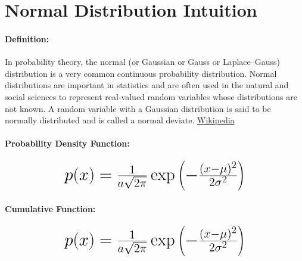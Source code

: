 \documentclass[12pt]{article}
\newcommand{\negBi}[3][2]{(#2- #3)^{#1}}
\newcommand*{\mH}[1]{\mbox{\huge$#1$}}
\begin{document}
\section*{Normal Distribution Intuition}
\paragraph{Definition:}%

In probability theory, the normal (or Gaussian or Gauss or Laplace–Gauss) distribution is a very common continuous probability distribution. Normal distributions are important in statistics and are often used in the natural and social sciences to represent real-valued random variables whose distributions are not known. A random variable with a Gaussian distribution is said to be normally distributed and is called a normal deviate. \href{https://en.wikipedia.org/wiki/Normal_distribution}{Wikipedia}

\paragraph{Probability Density Function:}
\begin{equation}
	\mH{%
		p(x) = \frac{1}{a\sqrt{2\pi}}\exp
		\left(-\frac{\negBi{x}{\mu}}{2\sigma^2}\right)
	}
\end{equation}

\paragraph{Cumulative Function:}
\begin{equation}
	\mH{%
		p(x) = \frac{1}{a\sqrt{2\pi}}\exp
		\left(-\frac{\negBi{x}{\mu}}{2\sigma^2}\right)
	}
\end{equation}

\end{document}
